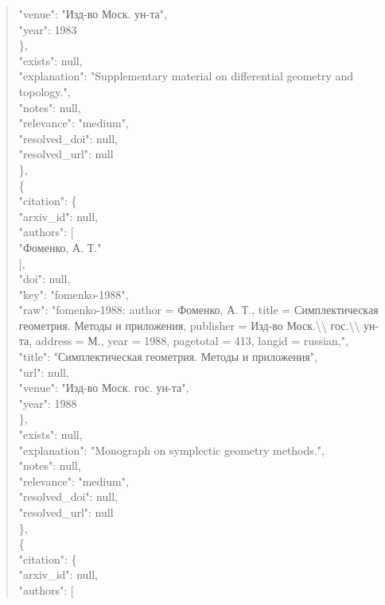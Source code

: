 \documentclass[11pt]{article}
\begin{document}
\begin{quote}
        "venue": "Изд-во Моск. ун-та",\\
        "year": 1983\\
      \},\\
      "exists": null,\\
      "explanation": "Supplementary material on differential geometry and topology.",\\
      "notes": null,\\
      "relevance": "medium",\\
      "resolved\_doi": null,\\
      "resolved\_url": null\\
    \},\\
    \{\\
      "citation": \{\\
        "arxiv\_id": null,\\
        "authors": [\\
          "Фоменко, А. Т."\\
        ],\\
        "doi": null,\\
        "key": "fomenko-1988",\\
        "raw": "fomenko-1988: author = Фоменко, А. Т., title = Симплектическая геометрия. Методы и приложения, publisher = Изд-во Моск.\textbackslash{}\textbackslash{} гос.\textbackslash{}\textbackslash{} ун-та, address = М., year = 1988, pagetotal = 413, langid = russian,",\\
        "title": "Симплектическая геометрия. Методы и приложения",\\
        "url": null,\\
        "venue": "Изд-во Моск. гос. ун-та",\\
        "year": 1988\\
      \},\\
      "exists": null,\\
      "explanation": "Monograph on symplectic geometry methods.",\\
      "notes": null,\\
      "relevance": "medium",\\
      "resolved\_doi": null,\\
      "resolved\_url": null\\
    \},\\
    \{\\
      "citation": \{\\
        "arxiv\_id": null,\\
        "authors": [\\

\end{quote}
\end{document}
